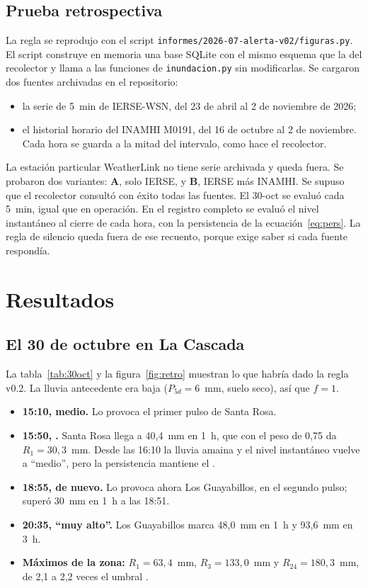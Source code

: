 \documentclass{sosg-informe}
\begin{document}
\subsection{Prueba retrospectiva}\label{sec:metodo-retro}
La regla se reprodujo con el script \texttt{informes/2026-07-alerta-v02/figuras.py}. El script construye en memoria una base SQLite con el mismo esquema que la del recolector y llama a las funciones de \texttt{inundacion.py} sin modificarlas. Se cargaron dos fuentes archivadas en el repositorio:
\begin{itemize}
  \item la serie de 5~min de IERSE-WSN, del 23 de abril al 2 de noviembre de 2026;
  \item el historial horario del INAMHI M0191, del 16 de octubre al 2 de noviembre. Cada hora se guarda a la mitad del intervalo, como hace el recolector.
\end{itemize}
La estación particular WeatherLink no tiene serie archivada y queda fuera. Se probaron dos variantes: \textbf{A}, solo IERSE, y \textbf{B}, IERSE más INAMHI. Se supuso que el recolector consultó con éxito todas las fuentes. El 30-oct se evaluó cada 5~min, igual que en operación. En el registro completo se evaluó el nivel instantáneo al cierre de cada hora, con la persistencia de la ecuación~\eqref{eq:pers}. La regla de silencio queda fuera de ese recuento, porque exige saber si cada fuente respondía.

\section{Resultados}

\subsection{El 30 de octubre en La Cascada}\label{sec:res-30oct}
La tabla~\ref{tab:30oct} y la figura~\ref{fig:retro} muestran lo que habría dado la regla v0.2. La lluvia antecedente era baja ($P_{5d} = 6$~mm, suelo seco), así que $f = 1$.
\begin{itemize}
  \item \textbf{15:10, medio.} Lo provoca el primer pulso de Santa Rosa.
  \item \textbf{15:50, \alto.} Santa Rosa llega a 40,4~mm en 1~h, que con el peso de 0,75 da $R_1 = 30{,}3$~mm. Desde las 16:10 la lluvia amaina y el nivel instantáneo vuelve a \enquote{medio}, pero la persistencia mantiene el \alto{}.
  \item \textbf{18:55, \alto{} de nuevo.} Lo provoca ahora Los Guayabillos, en el segundo pulso; superó 30~mm en 1~h a las 18:51.
  \item \textbf{20:35, \enquote{muy alto}.} Los Guayabillos marca 48,0~mm en 1~h y 93,6~mm en 3~h.
  \item \textbf{Máximos de la zona:} $R_1 = 63{,}4$~mm, $R_3 = 133{,}0$~mm y $R_{24} = 180{,}3$~mm, de 2,1 a 2,2 veces el umbral \alto.
\end{itemize}
\end{document}
